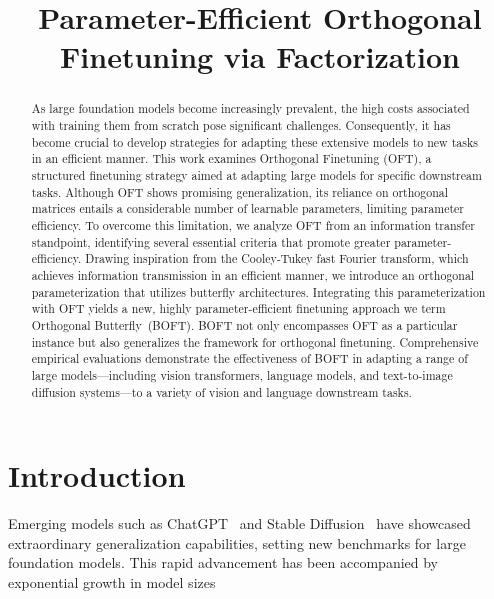 \title{Parameter-Efficient Orthogonal Finetuning via Factorization}

\begin{abstract}
As large foundation models become increasingly prevalent, the high costs associated with training them from scratch pose significant challenges. Consequently, it has become crucial to develop strategies for adapting these extensive models to new tasks in an efficient manner. This work examines Orthogonal Finetuning (OFT), a structured finetuning strategy aimed at adapting large models for specific downstream tasks. Although OFT shows promising generalization, its reliance on orthogonal matrices entails a considerable number of learnable parameters, limiting parameter efficiency. To overcome this limitation, we analyze OFT from an information transfer standpoint, identifying several essential criteria that promote greater parameter-efficiency. Drawing inspiration from the Cooley-Tukey fast Fourier transform, which achieves information transmission in an efficient manner, we introduce an orthogonal parameterization that utilizes butterfly architectures. Integrating this parameterization with OFT yields a new, highly parameter-efficient finetuning approach we term Orthogonal Butterfly~(BOFT). BOFT not only encompasses OFT as a particular instance but also generalizes the framework for orthogonal finetuning. Comprehensive empirical evaluations demonstrate the effectiveness of BOFT in adapting a range of large models—including vision transformers, language models, and text-to-image diffusion systems—to a variety of vision and language downstream tasks.
\end{abstract}

\section{Introduction}

Emerging models such as ChatGPT~\cite{brown2020language,chen2021evaluating} and Stable Diffusion~\cite{rombach2022high} have showcased extraordinary generalization capabilities, setting new benchmarks for large foundation models. This rapid advancement has been accompanied by exponential growth in model sizes

